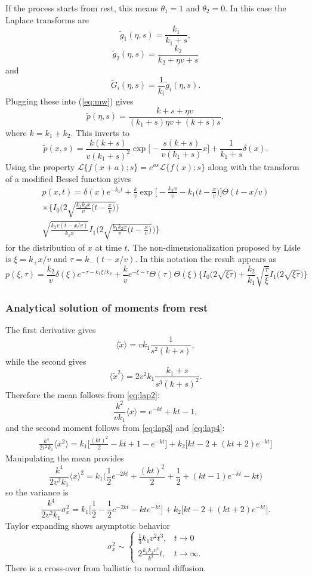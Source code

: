 \documentclass[11pt]{article}
\newcommand\be{\begin{equation}} %
\newcommand\ee{\end{equation}}   %
\newcommand\bra{\langle}
\newcommand\ket{\rangle}
\newcommand\El{\mathcal{L}}
\newcommand\tg{\tilde{g}}
\newcommand\tG{\tilde{G}}
\begin{document}
If the process starts from rest, this means $\theta_1 = 1$ and $\theta_2=0$.
In this case the Laplace transforms are
\be \tg_1(\eta,s) = \frac{k_1}{k_1 + s}, \ee 
\be \tg_2(\eta,s) = \frac{k_2}{k_2 + \eta v + s }\ee
and
\be \tG_i(\eta,s) = \frac{1}{k_i}\tg_i(\eta,s).\ee
Plugging these into (\ref{eq:mw}) gives
\be \tilde{p}(\eta,s) = \frac{k + s + \eta v }{(k_1+s) \eta v  + (k+s)s },\ee
where $k = k_1 + k_2$. 
This inverts to 
\be \tilde{p}(x,s) = \frac{k(k+s)}{v(k_1+s)^2} \exp\Big[-\frac{s(k+s)}{v(k_1+s)}x\Big] + \frac{1}{k_1+s}\delta(x) .\ee
Using the property $ \El\{f(x+a);s\} = e^{as}\El\{f(x);s\}$ along with the transform of a modified Bessel function gives
\begin{multline}
p(x,t) = \delta(x) e^{-k_1 t} + \frac{k}{v}\exp\Big[-\frac{k_2x }{v} - k_1\Big(t-\frac{x}{v}\Big)\Big]\Theta(t-x/v)\\ 
\times \Big\{ I_0\Big(2\sqrt{\frac{k_1k_2x}{v}\big(t-\frac{x}{v}\big)}\Big) \\
\sqrt{\frac{k_2 v(t-x/v)}{k_1x}}I_1\Big(2\sqrt{\frac{k_1k_2x}{v}\big(t-\frac{x}{v}\big)}\Big) 
\Big\}
\end{multline}
for the distribution of $x$ at time $t$.
The non-dimensionalization proposed by Lisle is $\xi = k_+ x /v$ and $\tau = k_-(t-x/v)$.
In this notation the result appears as
\be p(\xi,\tau) = \frac{k_2}{v}\delta(\xi)e^{-\tau-k_1\xi/k_2} +  \frac{k}{v}e^{-\xi-\tau}\Theta(\tau)\Theta(\xi)\Big\{I_0\big(2\sqrt{\xi \tau}\big) +\frac{k_2}{k_1}\sqrt{\frac{\tau}{\xi}}I_1\big(2\sqrt{\xi\tau}\big) \Big\}\ee

\subsubsection{Analytical solution of moments from rest}
The first derivative gives 
\be \bra \tilde{x} \ket = vk_1 \frac{1}{s^2(k+s)}, \label{eq:restmean}\ee
while the second gives 
\be \bra \tilde{x}^2 \ket = 2 v^2  k_1 \frac{k_1+s}{s^3(k+s)^2}. \label{eq:rest2ndmoment}\ee
Therefore the mean follows from \ref{eq:lap2}:
\be \frac{k^2}{vk_1} \bra x \ket = e^{-kt} + kt -1, \ee
and the second moment follows from \ref{eq:lap3} and \ref{eq:lap4}:
\begin{align}
\frac{k^4}{2v^2 k_1}\bra x^2 \ket = k_1\Big[\frac{(kt)^2}{2}-kt + 1 - e^{-kt}\Big] + k_2 \Big[kt -2 + (kt+2)e^{-kt}\Big]
\end{align}
Manipulating the mean provides 
\be \frac{k^4}{2v^2 k_1} \bra x \ket^2 = k_1 \Big(\frac{1}{2} e^{-2kt} + \frac{(kt)^2}{2} + \frac{1}{2} + (kt-1)e^{-kt} - kt\Big) \ee
so the variance is 
\be \frac{k^4}{2v^2 k_1}\sigma_x^2 = k_1 \Big[\frac{1}{2}-\frac{1}{2}e^{-2kt} - kt e^{-kt}\Big]  + k_2 \Big[kt -2 + (kt + 2)e^{-kt}\Big].\ee
Taylor expanding shows asymptotic behavior
\be \sigma_x^2 \sim 
\begin{cases}
	 \frac{1}{3}k_1v^2 t^3, & t\rightarrow 0 \\
	 2\frac{k_1k_2 v^2}{k^3} t, & t \rightarrow \infty.
\end{cases} \label{eq:sim}\ee
There is a cross-over from ballistic to normal diffusion.
\end{document}

